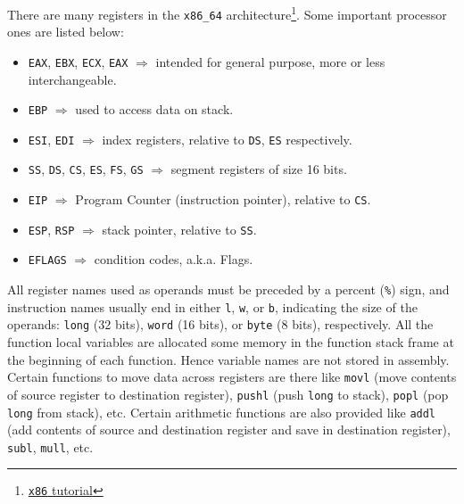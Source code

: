 \documentclass{article}
\begin{document}
\begin{flushleft}
There are many registers in the \texttt{x86\_64} architecture\footnote{\href{http://www.hep.wisc.edu/~pinghc/x86AssmTutorial.htm}{\texttt{x86} tutorial}}. Some important processor ones are listed below:
\begin{itemize}
\item \texttt{EAX}, \texttt{EBX}, \texttt{ECX}, \texttt{EAX} \(\Rightarrow\) intended for general purpose, more or less interchangeable.
\item \texttt{EBP} \(\Rightarrow\) used to access data on stack.
\item \texttt{ESI}, \texttt{EDI} \(\Rightarrow\) index registers, relative to \texttt{DS}, \texttt{ES} respectively.
\item \texttt{SS}, \texttt{DS}, \texttt{CS}, \texttt{ES}, \texttt{FS}, \texttt{GS} \(\Rightarrow\) segment registers of size 16 bits.
\item \texttt{EIP} \(\Rightarrow\) Program Counter (instruction pointer), relative to \texttt{CS}.
\item \texttt{ESP}, \texttt{RSP} \(\Rightarrow\) stack pointer, relative to \texttt{SS}.
\item \texttt{EFLAGS} \(\Rightarrow\) condition codes, a.k.a. Flags.
\end{itemize}

All register names used as operands must be preceded by a percent (\texttt{\%}) sign, and instruction names usually end in either \texttt{l}, \texttt{w}, or \texttt{b}, indicating the size of the operands: \texttt{long} (32 bits), \texttt{word} (16 bits), or \texttt{byte} (8 bits), respectively. All the function local variables are allocated some memory in the function stack frame at the beginning of each function. Hence variable names are not stored in assembly. Certain functions to move data across registers are there like \texttt{movl} (move contents of source register to destination register), \texttt{pushl} (push \texttt{long} to stack), \texttt{popl} (pop \texttt{long} from stack), etc. Certain arithmetic functions are also provided like \texttt{addl} (add contents of source and destination register and save in destination register), \texttt{subl}, \texttt{mull}, etc.
\end{flushleft}
\newpage
\end{document}
